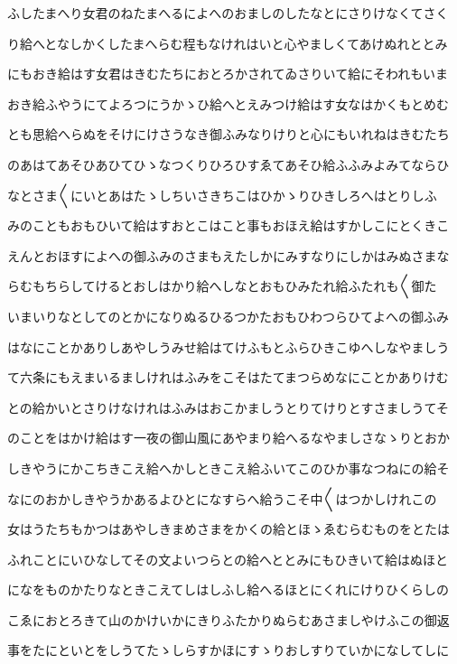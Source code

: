 \documentclass[a4paper,11pt,landscape]{ltjtarticle}
\begin{document}
ふしたまへり女君のねたまへるによへのおましのしたなとにさりけなくてさく
\par\medskip
り給へとなしかくしたまへらむ程もなけれはいと心やましくてあけぬれととみ
\par\medskip
にもおき給はす女君はきむたちにおとろかされてゐさりいて給にそわれもいま
\par\medskip
おき給ふやうにてよろつにうかゝひ給へとえみつけ給はす女なはかくもとめむ
\par\medskip
とも思給へらぬをそけにけさうなき御ふみなりけりと心にもいれねはきむたち
\par\medskip
のあはてあそひあひてひゝなつくりひろひすゑてあそひ給ふふみよみてならひ
\par\medskip
なとさま〱にいとあはたゝしちいさきちこはひかゝりひきしろへはとりしふ
\par\medskip
みのこともおもひいて給はすおとこはこと事もおほえ給はすかしこにとくきこ
\par\medskip
えんとおほすによへの御ふみのさまもえたしかにみすなりにしかはみぬさまな
\par\medskip
らむもちらしてけるとおしはかり給へしなとおもひみたれ給ふたれも〱御た
\par\medskip
いまいりなとしてのとかになりぬるひるつかたおもひわつらひてよへの御ふみ
\par\medskip
はなにことかありしあやしうみせ給はてけふもとふらひきこゆへしなやましう
\par\medskip
て六条にもえまいるましけれはふみをこそはたてまつらめなにことかありけむ
\par\medskip
との給かいとさりけなけれはふみはおこかましうとりてけりとすさましうてそ
\par\medskip
のことをはかけ給はす一夜の御山風にあやまり給へるなやましさなゝりとおか
\par\medskip
しきやうにかこちきこえ給へかしときこえ給ふいてこのひか事なつねにの給そ
\par\medskip
なにのおかしきやうかあるよひとになすらへ給うこそ中〱はつかしけれこの
\par\medskip
女はうたちもかつはあやしきまめさまをかくの給とほゝゑむらむものをとたは
\par\medskip
ふれことにいひなしてその文よいつらとの給へととみにもひきいて給はぬほと
\par\medskip
になをものかたりなときこえてしはしふし給へるほとにくれにけりひくらしの
\par\medskip
こゑにおとろきて山のかけいかにきりふたかりぬらむあさましやけふこの御返
\par\medskip
事をたにといとをしうてたゝしらすかほにすゝりおしすりていかになしてしに
\end{document}
